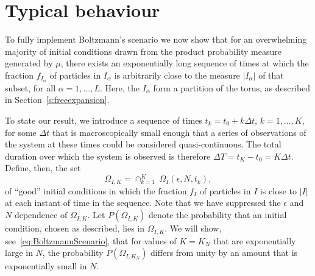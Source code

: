 \documentclass{article}
\numberwithin{equation}{section}
\begin{document}
\section{Typical behaviour}\label{s:typical}
To fully implement Boltzmann's scenario we now show that for an overwhelming majority of initial conditions drawn from
the product probability measure generated by $\mu$, there exists an exponentially long sequence of times at which the fraction $f_{I_\alpha}$ of particles in $I_\alpha$ is arbitrarily close to the measure $|I_\alpha|$ of that subset, for all $\alpha =1, \dots, L$. Here, the $I_\alpha$ form a partition of the torus, as described in Section~\ref{s:freeexpansion}.

To state our result, we introduce a sequence of times $t_k=t_0+k\Delta t$, $k=1,\dots , K$, for some $\Delta t$ that  is macroscopically small enough that a series of observations of the system at these times could be considered quasi-continuous. The total duration over which the system is observed is therefore $\Delta T=t_K-t_0=K\Delta t$. Define, then, the set
$$
\Omega_{I, K} =  \cap_{k=1}^{K}\ \Omega_I(\epsilon, N, t_k),
$$
of ``good'' initial conditions in which the fraction $f_{I}$ of particles in $I$ is close to $|I|$ at each instant of time in the sequence. Note that we have suppressed the $\epsilon$ and $N$ dependence of $\Omega_{I, K}$.  Let $P(\Omega_{I, K})$
denote the probability that an initial condition, chosen as described, lies in $\Omega_{I, K}$.  We will show, see~\eqref{eq:BoltzmannScenario}, that for values of $K=K_N$ that are exponentially large in $N$, the
probability $P(\Omega_{I, K_N})$ differs from unity by an amount that is exponentially small in $N$.
\end{document}
